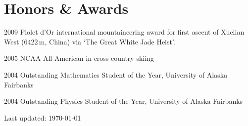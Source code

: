 \documentclass[10pt,letterpaper]{article}
\renewenvironment{itemize}{
  \begin{list}{}{
    \setlength{\leftmargin}{1.5em}
    \setlength{\itemsep}{0.25em}
    \setlength{\parskip}{0pt}
    \setlength{\parsep}{0.25em}
  }
}{
  \end{list}
}
\begin{document}
\section*{Honors \& Awards}
\begin{itemize}
\item 2009 Piolet d'Or international mountaineering award for first ascent of Xuelian West (6422\,m, China) via `The Great White Jade Heist'.
\item 2005 NCAA All American in cross-country skiing
\item 2004 Outstanding Mathematics Student of the Year, University of Alaska Fairbanks
\item 2004 Outstanding Physics Student of the Year, University of Alaska Fairbanks
\end{itemize}

\begin{center}
  \begin{small}
    Last updated: \today
  \end{small}
\end{center}
\end{document}
